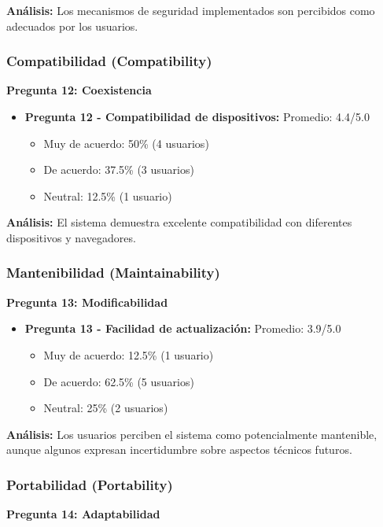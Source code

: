 \documentclass[conference]{IEEEtran}
\begin{document}
\textbf{Análisis:} Los mecanismos de seguridad implementados son percibidos como adecuados por los usuarios.

\subsubsection{Compatibilidad (Compatibility)}
\textbf{Pregunta 12: Coexistencia}

\begin{itemize}
    \item \textbf{Pregunta 12 - Compatibilidad de dispositivos:} Promedio: 4.4/5.0
        \begin{itemize}
            \item Muy de acuerdo: 50\% (4 usuarios)
            \item De acuerdo: 37.5\% (3 usuarios)
            \item Neutral: 12.5\% (1 usuario)
        \end{itemize}
\end{itemize}

\textbf{Análisis:} El sistema demuestra excelente compatibilidad con diferentes dispositivos y navegadores.

\subsubsection{Mantenibilidad (Maintainability)}
\textbf{Pregunta 13: Modificabilidad}

\begin{itemize}
    \item \textbf{Pregunta 13 - Facilidad de actualización:} Promedio: 3.9/5.0
        \begin{itemize}
            \item Muy de acuerdo: 12.5\% (1 usuario)
            \item De acuerdo: 62.5\% (5 usuarios)
            \item Neutral: 25\% (2 usuarios)
        \end{itemize}
\end{itemize}

\textbf{Análisis:} Los usuarios perciben el sistema como potencialmente mantenible, aunque algunos expresan incertidumbre sobre aspectos técnicos futuros.

\subsubsection{Portabilidad (Portability)}
\textbf{Pregunta 14: Adaptabilidad}
\end{document}
